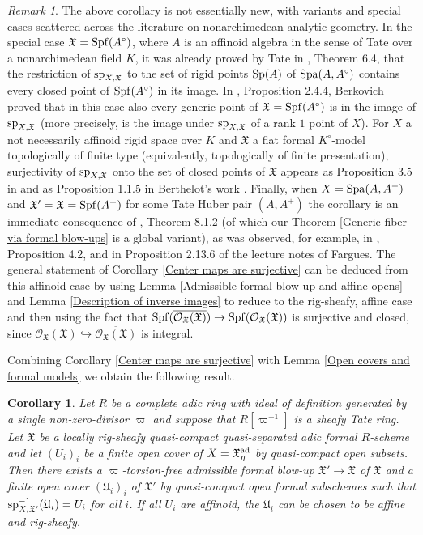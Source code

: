 \documentclass[12pt,twoside,a4paper]{article}
\newtheorem{cor}[thm]{Corollary}
\theoremstyle{definition}
\theoremstyle{remark}
\newtheorem{rmk}[thm]{Remark}
\newcommand\ad{{\rm ad}}
\newcommand\spc{{\rm sp}}
\newcommand\Sp{{\rm Sp}}
\newcommand\Spa{{\rm Spa}}
\newcommand\Spf{{\rm Spf}}
\begin{document}
\begin{rmk}\label{History of the specialization map}The above corollary is not essentially new, with variants and special cases scattered across the literature on nonarchimedean analytic geometry. In the special case $\mathfrak{X}=\Spf(A^{\circ})$, where $A$ is an affinoid algebra in the sense of Tate over a nonarchimedean field $K$, it was already proved by Tate in \cite{Tate}, Theorem 6.4, that the restriction of $\spc_{X,\mathfrak{X}}$ to the set of rigid points $\Sp(A)$ of $\Spa(A, A^{\circ})$ contains every closed point of $\Spf(A^{\circ})$ in its image. In \cite{Berkovich}, Proposition 2.4.4, Berkovich proved that in this case also every generic point of $\mathfrak{X}=\Spf(A^{\circ})$ is in the image of $\spc_{X,\mathfrak{X}}$ (more precisely, is the image under $\spc_{X,\mathfrak{X}}$ of a rank $1$ point of $X$). For $X$ a not necessarily affinoid rigid space over $K$ and $\mathfrak{X}$ a flat formal $K^{\circ}$-model topologically of finite type (equivalently, topologically of finite presentation), surjectivity of $\spc_{X,\mathfrak{X}}$ onto the set of closed points of $\mathfrak{X}$ appears as Proposition 3.5 in \cite{BL1} and as Proposition 1.1.5 in Berthelot's work \cite{Berthelot96}. Finally, when $X=\Spa(A, A^{+})$ and $\mathfrak{X}'=\mathfrak{X}=\Spf(A^{+})$ for some Tate Huber pair $(A, A^{+})$ the corollary is an immediate consequence of \cite{BhattNotes}, Theorem 8.1.2 (of which our Theorem \ref{Generic fiber via formal blow-ups} is a global variant), as was observed, for example, in \cite{Gleason22}, Proposition 4.2, and in Proposition 2.13.6 of the lecture notes \cite{Fargues22} of Fargues. The general statement of Corollary \ref{Center maps are surjective} can be deduced from this affinoid case by using Lemma \ref{Admissible formal blow-up and affine opens} and Lemma \ref{Description of inverse images} to reduce to the rig-sheafy, affine case and then using the fact that $\Spf(\overline{\mathcal{O}_{\mathfrak{X}}(\mathfrak{X})})\to \Spf(\mathcal{O}_{\mathfrak{X}}(\mathfrak{X}))$ is surjective and closed, since $\mathcal{O}_{\mathfrak{X}}(\mathfrak{X})\hookrightarrow \overline{\mathcal{O}_{\mathfrak{X}}(\mathfrak{X})}$ is integral.\end{rmk}
Combining Corollary \ref{Center maps are surjective} with Lemma \ref{Open covers and formal models} we obtain the following result.
\begin{cor}\label{Open covers and formal models 2}Let $R$ be a complete adic ring with ideal of definition generated by a single non-zero-divisor $\varpi$ and suppose that $R[\varpi^{-1}]$ is a sheafy Tate ring. Let $\mathfrak{X}$ be a locally rig-sheafy quasi-compact quasi-separated adic formal $R$-scheme and let $(U_{i})_{i}$ be a finite open cover of $X=\mathfrak{X}_{\eta}^{\ad}$ by quasi-compact open subsets. Then there exists a $\varpi$-torsion-free admissible formal blow-up $\mathfrak{X}'\to\mathfrak{X}$ of $\mathfrak{X}$ and a finite open cover $(\mathfrak{U}_{i})_{i}$ of $\mathfrak{X}'$ by quasi-compact open formal subschemes such that $\spc_{X,\mathfrak{X}'}^{-1}(\mathfrak{U}_{i})=U_{i}$ for all $i$. If all $U_{i}$ are affinoid, the $\mathfrak{U}_{i}$ can be chosen to be affine and rig-sheafy.\end{cor}
\end{document}
